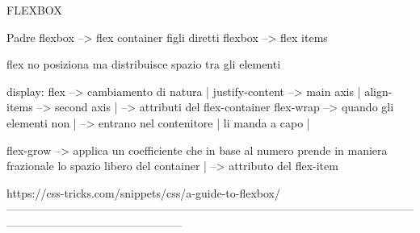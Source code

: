 \documentclass{article}
\begin{document}
FLEXBOX

Padre flexbox --> flex container
figli diretti flexbox --> flex items


flex no posiziona ma distribuisce spazio tra gli elementi

display: flex --> cambiamento di natura  |
justify-content --> main axis            |   
align-items --> second axis              |  --> attributi del flex-container
flex-wrap --> quando gli elementi non    |  -->
              entrano nel contenitore    |
              li manda a capo            |

flex-grow --> applica un coefficiente che in base al numero prende in maniera frazionale lo spazio libero del container  | --> attributo del flex-item
 
https://css-tricks.com/snippets/css/a-guide-to-flexbox/
-----------------------------------------------------------------------------------------------------------------------------------------------------------
\end{document}

